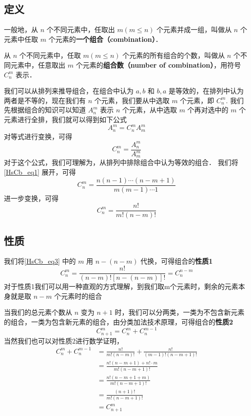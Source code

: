 

\subsection{定义}
一般地，从 $n$ 个不同元素中，任取出 $m(m\leq n)$ 个元素并成一组，叫做从 $n$ 个元素中任取 $m$ 个元素的\textbf{一个组合（combination）}．

从 $n$ 个不同元素中，任取 $m(m\leq n)$ 个元素的所有组合的个数，叫做从 $n$ 个不同元素中，任意取出 $m$ 个元素的\textbf{组合数（number of combination）}，用符号 $C_n^m$ 表示．

我们可以从排列来推导组合，在组合中认为 ${a,b}$ 和 ${b,a}$ 是等效的，在排列中认为两者是不等的，现在我们有 $n$ 个元素，我们要从中选取 $m$ 个元素，即 $C_n^m$.
我们先根据组合的知识可以知道 $A_n^m$ 表示 $n$ 个元素，从中选取 $m$ 个再对选中的 $m$ 个元素进行全排，我们就可以得到如下公式
\begin{equation}
A_n^m = C_n^m A_m^m
\end{equation}
对等式进行变换，可得
\begin{equation}\label{HsCb_eq1}
C_n^m = \frac {A_n^m}{A_m^m}
\end{equation}
对于这个公式，我们可理解为，从排列中排除组合中认为等效的组合．
我们将\autoref{HsCb_eq1} 展开，可得
\begin{equation}\label{HsCb_eq2} 
C_n^m = \frac{n(n -1) \cdots(n -m + 1)}{m(m-1)\cdots 1}
\end{equation}
进一步变换，可得
\begin{equation}\label{HsCb_eq3}
C_n^m = \frac{n!}{m!(n-m)!}
\end{equation}

\subsection{性质}

我们将\autoref{HsCb_eq3} 中的 $m$ 用 $n-(n-m) $ 代换，可得组合的\textbf{性质1}
\begin{equation}
C_n^m = \frac{n!}{(n -m)![n-(n-m)]!} = C_n^{n-m}
\end{equation}
对于性质1我们可以用一种直观的方式理解，到我们取m个元素时，剩余的元素本身就是取 $n-m$ 个元素时的组合

当我们的总元素个数从 $n$ 变为 $n+1$ 时，我们可以分两类，一类为不包含新元素的组合，一类为包含新元素的组合，由分类加法技术原理，可得组合的\textbf{性质2}
\begin{equation}
C_{n + 1}^m = C_n^m + C_n^{m -1}
\end{equation}
当然我们也可以对性质2进行数学证明，
\begin{equation}
\begin{aligned}
C_n^m + C_n^{m - 1} 
&= \frac{n!}{m!(n-m)!} + \frac{n!}{(m - 1)!(n - m + 1)!}\\
&= \frac{n!(n - m + 1) + n!\cdot m}{m!(n - m + 1)!}\\
&= \frac{n!(n - m + 1 + m) }{m!(n - m + 1)!}\\
&= \frac{(n + 1)!}{m!(n - m + 1)!}\\
&= C_{n + 1}^m
\end{aligned}
\end{equation}


